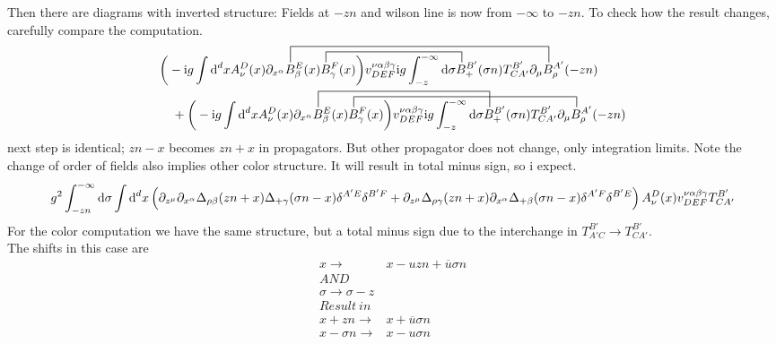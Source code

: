 Then there are diagrams with inverted structure: Fields at $-zn$ and wilson line is now from $-\infty$ to $-zn$. 
To check how the result changes, carefully compare the computation. 
\begin{align}
	&\contraction[3ex]{\bigg(-\imag g \int \ddx xA_\nu^D(x) \partial_{x^\alpha}}{B}{_\beta^{E} (x) B_\gamma^F(x) \bigg) v^{\nu \alpha\beta\gamma}_{DEF}\imag g \int_{-z}^{-\infty} \dx \sigma B_+^{B'}(\sigma n) T^{B'}_{CA'}\partial_\mu}{B}
	\contraction[2ex]{\bigg(-\imag g \int \ddx xA_\nu^D(x) \partial_{x^\alpha} B_\beta^{E} (x) }{B}{_\gamma^F(x) \bigg) v^{\nu \alpha\beta\gamma}_{DEF}\imag g \int_{-z}^{-\infty} \dx \sigma }{B}
	\bigg(-\imag g \int \ddx xA_\nu^D(x) \partial_{x^\alpha} B_\beta^{E} (x) B_\gamma^F(x) \bigg) v^{\nu \alpha\beta\gamma}_{DEF}\imag g \int_{-z}^{-\infty} \dx \sigma B_+^{B'}(\sigma n) T^{B'}_{CA'}\partial_\mu B^{A'}_\rho (-zn) 
	\nl
	+
	\contraction[3ex]{\bigg(-\imag g \int \ddx xA_\nu^D(x) \partial_{x^\alpha}}{B}{_\beta^{E} (x) B_\gamma^F(x) \bigg) v^{\nu \alpha\beta\gamma}_{DEF}\imag g \int_{-z}^{-\infty} \dx \sigma}{B}
	\contraction[2ex]{\bigg(-\imag g \int \ddx xA_\nu^D(x) \partial_{x^\alpha} B_\beta^{E} (x)}{B}{_\gamma^F(x) \bigg) v^{\nu \alpha\beta\gamma}_{DEF}\imag g \int_{-z}^{-\infty} \dx \sigma B_+^{B'}(\sigma n) T^{B'}_{CA'}\partial_\mu}{B}
	\bigg(-\imag g \int \ddx xA_\nu^D(x) \partial_{x^\alpha} B_\beta^{E} (x) B_\gamma^F(x) \bigg) v^{\nu \alpha\beta\gamma}_{DEF}\imag g \int_{-z}^{-\infty} \dx \sigma B_+^{B'}(\sigma n) T^{B'}_{CA'}\partial_\mu B^{A'}_\rho (-zn)
\end{align}
next step is identical; $zn-x$ becomes $zn+x$ in propagators. But other propagator does not change, only integration limits. Note the change of order of fields also implies other color structure. It will result in total minus sign, so i expect.
\begin{align}
g^2\int_{-zn}^{-\infty} \text{d} \sigma  \int \text{d} ^d x 
\left( \partial_{z^\mu} \partial_{x^\alpha} \Delta_{\rho \beta}(zn+x) \Delta_{+ \gamma}(\sigma n -x)\delta^{A'E} \delta^{B'F} + \partial_{z^\mu}  \Delta_{\rho \gamma}(zn+x) \partial_{x^\alpha}\Delta_{+ \beta}(\sigma n -x) \delta^{A'F} \delta^{B'E} \right)A_{\nu}^{D}(x)v^{\nu \alpha\beta\gamma}_{DEF} T^{B'}_{CA'}
\end{align}
For the color computation we have the same structure, but a total minus sign due to the interchange in $T^{B'}_{A'C} \rightarrow T^{B'}_{CA'}$.
\\
The shifts in this case are
\begin{align}
x\rightarrow& x - uzn + \overline u \sigma n
\\
AND
\\
\sigma\rightarrow\sigma - z
\\
Result~in 
\\
x+zn \rightarrow & x + \overline u \sigma n
\\
x-\sigma n \rightarrow & x - u\sigma n
\end{align}
